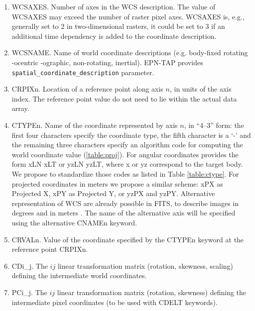\begin{enumerate}
{\DIFaddbegin {} \DIFaddendFL}
\item{WCSAXES.
Number of axes in the WCS description.
The value of WCSAXES may exceed the number of raster pixel axes. WCSAXES is, e.g.,
generally set to $2$ in two-dimensional rasters, it could be set to $3$ if an
additional time \DIFaddbegin {} \DIFaddendFL dependency is added to the coordinate description.}
\item{WCSNAME.
Name of world coordinate descriptions (e.g. body-fixed rotating -ocentric -ographic,
non-rotating, inertial).
EPN-TAP provides \DIFdelbegin {} \DIFdelendFL \DIFaddbegin {} \DIFdelendFL \texttt{spatial\_coordinate\_description} parameter.}
\DIFaddend \item{CRPIXn.
Location of a reference point along axis $n$, in units of the axis index.
The reference point value do not need to lie within the actual data array.}
\item{CTYPEn.
Name of the coordinate represented by axis $n$, in ``4--3'' form: the first four
characters specify the coordinate type, the fifth character is a `-' and the
remaining three characters specify an algorithm code for computing the world coordinate
value (\ref{table:proj}).
For angular coordinates \citet{calagreisenI} provides the form xLN xLT or yzLN yzLT,
where x or yz correspond to the target body.
We propose to standardize those codes as listed in Table \ref{table:ctype}.
For projected coordinates in meters we propose a similar scheme: xPX as Projected X,
xPY as Projected Y, or yzPX and yzPY.
Alternative representation of WCS are already possible in FITS, to describe images in
degrees and in meters \citep{greisencalaII}.
The name of the alternative axis will be specified using the alternative CNAMEn
keyword.}
\item{CRVALn.
Value of the coordinate specified by the CTYPEn keyword at the reference point CRPIXn.}
\item{CDi\_j.
The $ij$ linear transformation matrix (rotation, skewness, scaling) defining the
intermediate world coordinates.}
\item{PCi\_j.
The $ij$ linear transformation matrix (rotation, skewness) defining the intermediate
pixel coordinates (to be used with CDELT keywords).}

\end{enumerate}
